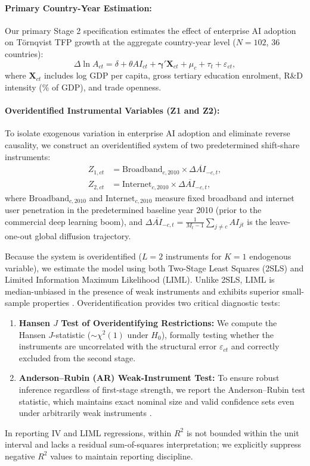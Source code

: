 \documentclass[11pt,a4paper]{article}
\begin{document}
\paragraph{Primary Country-Year Estimation:}
Our primary Stage 2 specification estimates the effect of enterprise AI adoption on Törnqvist TFP growth at the aggregate country-year level ($N = 102$, 36 countries):
\begin{equation}
    \Delta \ln A_{ct} = \delta + \theta AI_{ct} + \bm{\gamma}' \mathbf{X}_{ct} + \mu_c + \tau_t + \varepsilon_{ct},
    \label{eq:stage2_agg}
\end{equation}
where $\mathbf{X}_{ct}$ includes log GDP per capita, gross tertiary education enrolment, R\&D intensity (\% of GDP), and trade openness.

\paragraph{Overidentified Instrumental Variables (Z1 and Z2):}
To isolate exogenous variation in enterprise AI adoption and eliminate reverse causality, we construct an overidentified system of two predetermined shift-share instruments:
\begin{align}
    Z_{1,ct} &= \text{Broadband}_{c, 2010} \times \Delta \overline{AI}_{-c, t}, \label{eq:z1} \\
    Z_{2,ct} &= \text{Internet}_{c, 2010} \times \Delta \overline{AI}_{-c, t}, \label{eq:z2}
\end{align}
where $\text{Broadband}_{c, 2010}$ and $\text{Internet}_{c, 2010}$ measure fixed broadband and internet user penetration in the predetermined baseline year 2010 (prior to the commercial deep learning boom), and $\Delta \overline{AI}_{-c, t} = \frac{1}{M_t - 1} \sum_{j \ne c} AI_{jt}$ is the leave-one-out global diffusion trajectory.

Because the system is overidentified ($L = 2$ instruments for $K = 1$ endogenous variable), we estimate the model using both Two-Stage Least Squares (2SLS) and Limited Information Maximum Likelihood (LIML). Unlike 2SLS, LIML is median-unbiased in the presence of weak instruments and exhibits superior small-sample properties \citep{stock2002}. Overidentification provides two critical diagnostic tests:
\begin{enumerate}
    \item \textbf{Hansen $J$ Test of Overidentifying Restrictions:} We compute the Hansen $J$-statistic ($\sim \chi^2(1)$ under $H_0$), formally testing whether the instruments are uncorrelated with the structural error $\varepsilon_{ct}$ and correctly excluded from the second stage.
    \item \textbf{Anderson--Rubin (AR) Weak-Instrument Test:} To ensure robust inference regardless of first-stage strength, we report the Anderson--Rubin test statistic, which maintains exact nominal size and valid confidence sets even under arbitrarily weak instruments \citep{anderson1949, stock2005}.
\end{enumerate}
In reporting IV and LIML regressions, within $R^2$ is not bounded within the unit interval and lacks a residual sum-of-squares interpretation; we explicitly suppress negative $R^2$ values to maintain reporting discipline.
\end{document}
